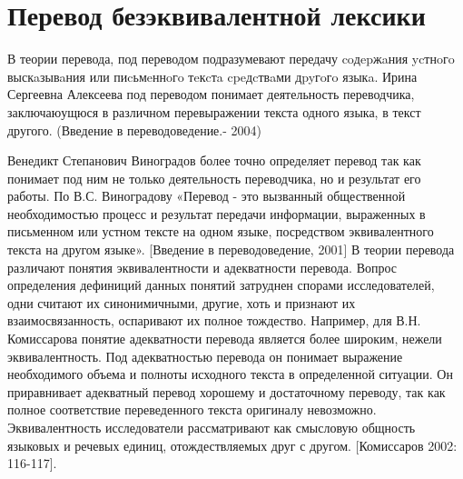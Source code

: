\section{Перевод безэквивалентной лексики}

\par В теории перевода, под переводом подразумевают передачу coдepжaния ycтнoгo выскaзывaния или пиcьмeннoгo тeкcтa cpeдcтвaми дpyгoгo языкa.  Ирина Сергеевна Алексеева под переводом понимает деятельность переводчика, заключаюущюся в различном перевыражении текста одного языка, в текст другого. (Введение в переводоведение.- 2004) 
\par Венедикт Степанович Виноградов более точно определяет перевод так как понимает под ним не только деятельность переводчика, но и результат его работы. По В.С. Виноградову «Перевод - это вызванный общественной необходимостью процесс и результат передачи информации, выраженных в письменном или устном тексте на одном языке, посредством эквивалентного текста на другом языке». [Введение в переводоведение, 2001]
В теории перевода различают понятия эквивалентности и адекватности перевода. Вопрос определения дефиниций данных понятий затруднен спорами исследователей, одни считают их синонимичными, другие, хоть и признают их взаимосвязанность, оспаривают их полное тождество. Например, для В.Н. Комиссарова понятие адекватности перевода является более широким, нежели эквивалентность. Под адекватностью перевода он понимает выражение необходимого объема и полноты исходного текста в определенной ситуации. Он приравнивает адекватный перевод  хорошему и достаточному переводу, так как полное соответствие переведенного текста оригиналу невозможно.   Эквивалентность исследователи рассматривают  как смысловую общность языковых и речевых единиц, отождествляемых друг с другом. [Комиссаров 2002: 116-117]. 

